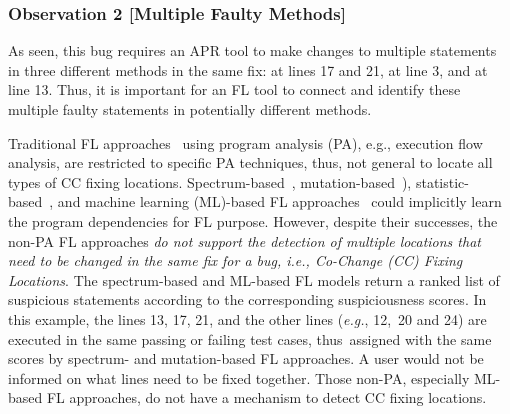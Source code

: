 

\subsubsection{Observation 2 [Multiple Faulty Methods]}
As seen, this bug requires an APR tool to make changes to multiple
statements in three different methods in the same fix:
  at lines 17 and 21,  at line
3, and  at line 13. Thus, it is important for an
FL tool to connect and identify these multiple faulty statements in
potentially different methods.


Traditional FL approaches~\cite{zhang-fse09,ICICA-10} using program
analysis (PA), e.g., execution flow analysis, are restricted to
specific PA techniques, thus, not general to locate all types of CC
fixing locations.
Spectrum-based~\cite{jones2005empirical,abreu2006evaluation},
mutation-based~\cite{MUSE,papadakis2012using,Metallaxis}),
statistic-based~\cite{liblit-pldi05}, and machine learning (ML)-based
FL approaches~\cite{DeepFL,icse21-fl} could implicitly learn the
program dependencies for FL purpose. However, despite their successes,
the non-PA FL approaches {\em do not support the detection of multiple
  locations that need to be changed in the same fix for a bug, i.e.,
  Co-Change (CC) Fixing Locations}.
%
The spectrum-based and ML-based FL models return a ranked list of
suspicious statements according to the corresponding suspiciousness
scores. In this example, the lines 13, 17, 21, and the other lines
({\em e.g.}, 12,~20 and 24) are executed in the same passing or
failing test cases, thus~assigned with the same scores by
spectrum- and mutation-based FL approaches. A user would not be
informed on what lines need to be fixed together. Those non-PA,
especially ML-based FL approaches, do not have a mechanism to detect CC
fixing locations.

